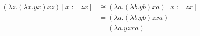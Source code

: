 \begin{gather*}
    \begin{split}
        (\lambda z. (\lambda x . yx) xz) [x:=zx] & \cong (\lambda a. (\lambda b . yb) xa) [x:=zx] \\
        & = (\lambda a. (\lambda b . yb) zxa) \\
        & = (\lambda a. yzxa)
    \end{split}
\end{gather*}